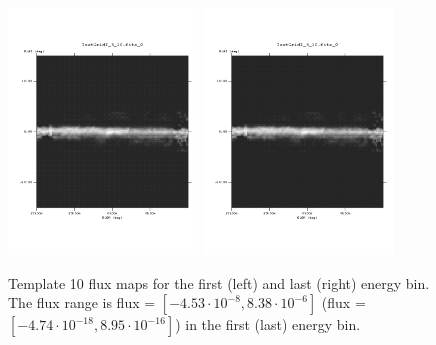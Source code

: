 \documentclass{article}
\begin{document}
\begin{figure}
\centering
\includegraphics[trim = 50 100 70 100, clip = true, width=0.45\textwidth]{figs/Template_maps/Template10_Ebin01}
\includegraphics[trim = 50 100 70 100, clip = true, width=0.45\textwidth]{figs/Template_maps/Template10_Ebin71}
\caption{Template 10 flux maps for the first (left) and last (right) energy bin. The flux range is flux = $[-4.53 \cdot 10^{-8}, 8.38 \cdot 10^{-6}]$ (flux = $[-4.74 \cdot 10^{-18}, 8.95 \cdot 10^{-16}]$) in the first (last) energy bin.}
\end{figure}
\end{document}
